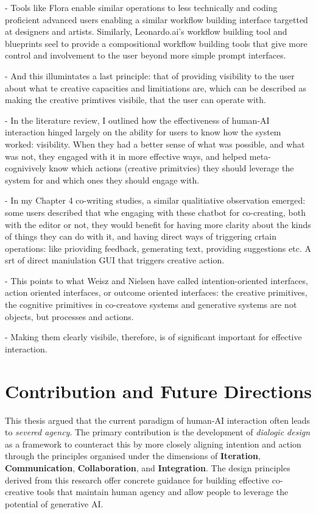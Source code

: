 - Tools like Flora enable similar operations to less technically and coding proficient advanced users enabling a similar workflow building interface targetted at designers and artists. Similarly, Leonardo.ai's workflow building tool and blueprints seel to provide a compositional workflow building tools that give more control and involvement to the user beyond more simple prompt interfaces. 

- And this illumintates a last principle: that of providing visibility to the user about what te creative capacities and limitiations are, which can be described as making the creative primtives visibile, that the user can operate with. 

- In the literature review, I outlined how the effectiveness of human-AI interaction hinged largely on the ability for users to know how the system worked: visibility. When they had a better sense of what was possible, and what was not, they engaged with it in more effective ways, and helped meta-cognivively know which actions (creative primitvies) they should leverage the system for and which ones they should engage with. 

- In my Chapter 4 co-writing studies, a similar qualitiative observation emerged: some users described that whe engaging with these chatbot for co-creating, both with the editor or not, they would benefit for having more clarity about the kinds of things they can do with it, and having direct ways of triggering crtain operations: like prioviding feedback, gemerating text, providing suggestions etc. A srt of direct maniulation GUI that triggers creative action. 

- This points to what Weisz and Nielsen have called intention-oriented interfaces, action oriented interfaces, or outcome oriented interfaces: the creative primitives, the cognitive primitives in co-creatove systems and generative systems are not objects, but processes and actions. 

- Making them clearly visibile, therefore, is of significant important for effective interaction. 

\section{Contribution and Future Directions}
This thesis argued that the current paradigm of human-AI interaction often leads to \textit{severed agency}. The primary contribution is the development of \textit{dialogic design} as a framework to counteract this by more closely aligning intention and action through the principles organised under the dimensions of \textbf{Iteration}, \textbf{Communication}, \textbf{Collaboration}, and \textbf{Integration}. The design principles derived from this research offer concrete guidance for building effective co-creative tools that maintain human agency and allow people to leverage the potential of generative AI.
